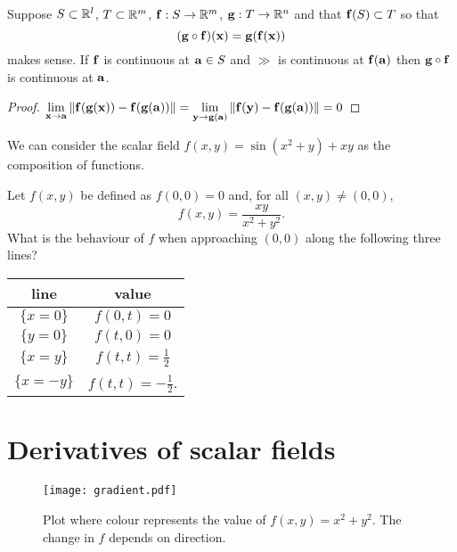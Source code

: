\begin{theorem}
    Suppose \(S \subset \bR^l\), \(T\subset \bR^m\), \(\ff:S \to \bR^m\), \(\gg : T \to \bR^n\) and that \(\ff(S) \subset T\) so that
    \[(\gg \circ \ff)(\xx) = \gg(\ff(\xx))\]
    makes sense.
    If \(\ff\) is continuous at \(\aa\in S\) and \(\gg\) is continuous at \(\ff(\aa)\) then \(\gg\circ \ff\) is continuous at \(\aa\).
\end{theorem}

\begin{proof}
    \(\displaystyle\lim_{\xx\to\aa}\norm{\ff(\gg(\xx))-\ff(\gg(\aa))}  =\displaystyle\lim_{\yy\to\gg(\aa)}\norm{\ff(\yy)-\ff(\gg(\aa))}  =0   \)
\end{proof}

\begin{example*}
    We can consider the scalar field \(f(x,y)= \sin(x^2 + y) + x y\) as the composition of functions.
\end{example*}



\begin{example*}
    Let \(f(x,y)\) be defined as \(f(0,0)=0\) and, for all \((x,y)\neq (0,0)\),
    \[
        f(x,y) =
        \frac{x y}{x^2 + y^2}.
    \]
    What is the behaviour of \(f\) when approaching \((0,0)\) along the following three lines?
    \begin{center}
        \begin{tabular}{ c | c }
            line         & value                     \\
            \hline
            \(\{x=0\}\)  & \(f(0,t) =  0\)           \\
            \(\{y=0\}\)  & \(f(t,0) = 0\)            \\
            \(\{x=y\}\)  & \(f(t,t) = \frac{1}{2}\)  \\
            \(\{x=-y\}\) & \(f(t,t) =-\frac{1}{2}\).
        \end{tabular}
    \end{center}
\end{example*}



\section{Derivatives of scalar fields}


\begin{figure}
    \begin{center}
        \texttt{[image: gradient.pdf]}
        \caption{Plot where colour represents the value of \(f(x,y)=x^2 + y^2\). The change in \(f\) depends on direction.}
    \end{center}
\end{figure}




